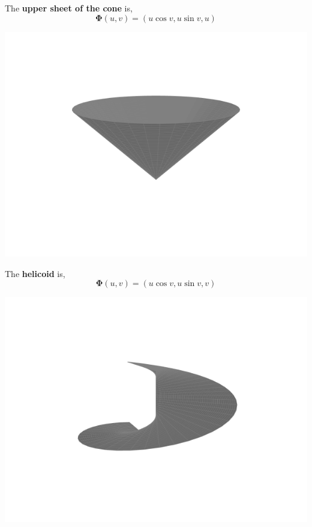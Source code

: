 \begin{marginfigure}
    The \textbf{upper sheet of the cone} is,
    \[\mathbf{\Phi}(u, v)=(u \cos v, u \sin v, u)\]
    \begin{center}
       \includegraphics[width=\textwidth]{figures/wk-6/fig-14.png}
    \end{center}
    
    \LineBreak

    The \textbf{helicoid} is,
    \[\mathbf{\Phi}(u, v)=(u \cos v, u \sin v, v)\]
    \begin{center}
        \includegraphics[width=\textwidth]{figures/wk-6/fig-15.png}
    \end{center}
    
\end{marginfigure}

